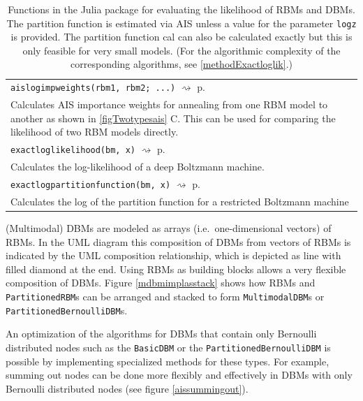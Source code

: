 \documentclass[12pt]{article}
\newcommand{\inlinecode}[1]{\texttt{#1}}
\newcommand{\rightpageref}[1]{\hfill $\rightsquigarrow$ p.\ \pageref{#1}}
\begin{document}
\begin{table}[h]
\begin{tabularx}{\textwidth}{X}
     \inlinecode{aislogimpweights(rbm1, rbm2; ...)}  \rightpageref{bms_aislogimpweights} \\
    Calculates AIS importance weights for annealing from one RBM model to another as shown in \ref{figTwotypesais} C.
    This can be used for comparing the likelihood of two RBM models directly.\\
       \inlinecode{exactloglikelihood(bm, x)} \rightpageref{bms_exactloglikelihood} \\
   Calculates the log-likelihood of a deep Boltzmann machine. \\
   \inlinecode{exactlogpartitionfunction(bm, x)} \rightpageref{bms_exactlogpartitionfunction} \\
   Calculates the log of the partition function for a restricted Boltzmann machine \\
   \hline
\end{tabularx}
\caption{Functions in the Julia package for evaluating the likelihood of RBMs and DBMs. The partition function is estimated via AIS unless a value for the parameter \inlinecode{logz} is provided. The partition function cal can also be calculated exactly but this is only feasible for very small models. (For the algorithmic complexity of the corresponding algorithms, see \ref{methodExactloglik}.) }
\label{juliaFunTableEval}
\end{table}


(Multimodal) DBMs are modeled as arrays (i.e.\ one-dimensional vectors) of RBMs.
In the UML diagram this composition of DBMs from vectors of RBMs is indicated by the UML composition relationship, which is depicted as line with filled diamond at the end.
Using RBMs as building blocks allows a very flexible composition of DBMs.
Figure \ref{mdbmimplasstack} shows how RBMs and \inlinecode{PartitionedRBM}s can be  arranged  and stacked to form \inlinecode{MultimodalDBM}s or \inlinecode{PartitionedBernoulliDBM}s.

An optimization of the algorithms for DBMs that contain only Bernoulli distributed nodes such as the \inlinecode{BasicDBM} or the \inlinecode{PartitionedBernoulliDBM} is possible by implementing specialized methods for these types.
For example, summing out nodes can be done more flexibly and effectively in DBMs with only Bernoulli distributed nodes (see figure \ref{aissummingout}).
\end{document}
